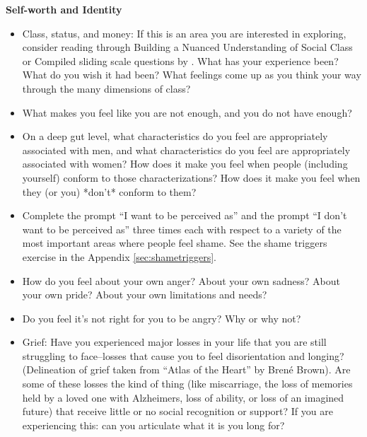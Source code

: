 \documentclass[12pt,letterpaper]{book}
\begin{document}
\noindent \textbf{Self-worth and Identity}
\begin{itemize}
    \item Class, status, and money: If this is an area you are interested in exploring, consider reading through Building a Nuanced Understanding of Social Class or Compiled sliding scale questions by \textcite{harperClass} . What has your experience been? What do you wish it had been? What feelings come up as you think your way through the many dimensions of class?
    \item  What makes you feel like you are not enough, and you do not have enough?
    \item  On a deep gut level, what characteristics do you feel are appropriately associated with men, and what characteristics do you feel are appropriately associated with women? How does it make you feel when people (including yourself) conform to those characterizations? How does it make you feel when they (or you) *don't* conform to them?
    \item  Complete the prompt “I want to be perceived as” and the prompt “I don't want to be perceived as” three times each with respect to a variety of the most important areas where people feel shame. See the shame triggers exercise in the Appendix \ref{sec:shametriggers}.
    \item  How do you feel about your own anger? About your own sadness? About your own pride? About your own limitations and needs?
    \item  Do you feel it's not right for you to be angry? Why or why not?
    \item  Grief: Have you experienced major losses in your life that you are still struggling to face--losses that cause you to feel disorientation and longing? (Delineation of grief taken from “Atlas of the Heart” by Brené Brown). Are some of these losses the kind of thing (like miscarriage, the loss of memories held by a loved one with Alzheimers, loss of ability, or loss of an imagined future) that receive little or no social recognition or support? If you are experiencing this: can you articulate what it is you long for?
\end{itemize}
\end{document}
